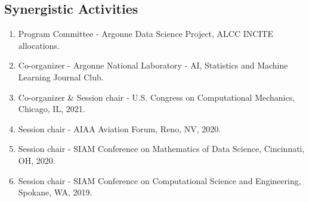 \documentclass[11pt]{article}
\begin{document}
\subsection*{Synergistic Activities}
\begin{enumerate}
\parskip = -2pt
%
\item Program Committee - Argonne Data Science Project, ALCC INCITE allocations.
\item Co-organizer - Argonne National Laboratory - AI, Statistics and Machine Learning Journal Club.
\item Co-organizer \& Session chair - U.S. Congress on Computational Mechanics, Chicago, IL, 2021.
\item Session chair - AIAA Aviation Forum, Reno, NV, 2020.
\item Session chair - SIAM Conference on Mathematics of Data Science, Cincinnati, OH, 2020.
\item Session chair - SIAM Conference on Computational Science and Engineering, Spokane, WA, 2019.
\end{enumerate}
\end{document}
